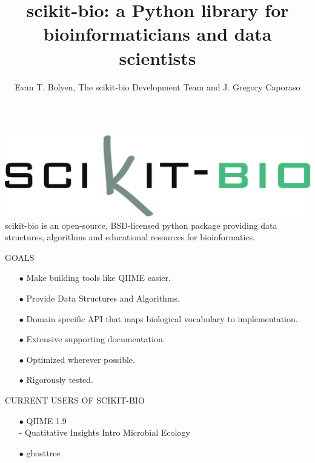 \documentclass[final,t]{beamer}
\title{\huge scikit-bio: a Python library for bioinformaticians and data scientists}
\author{Evan T. Bolyen, The scikit-bio Development Team and J. Gregory Caporaso}
\institute{Affiliations go here}
\begin{document}
\begin{frame}{}
  \begin{columns}[t]
    \begin{column}{.3\linewidth}
        \begin{alertblock}{\includegraphics[width=1\linewidth]{assets/skbio}\newline\newline}
          scikit-bio is an open-source, BSD-licensed python package providing data structures, algorithms and educational resources for bioinformatics.
          \newline\newline
        \end{alertblock}

        \begin{block}{GOALS}
            \large{\begin{itemize}
                \item[$\bullet$] Make building tools like QIIME easier.
                \item[$\bullet$] Provide Data Structures and Algorithms.
                \item[$\bullet$] Domain specific API that maps biological vocabulary to implementation.
                \item[$\bullet$] Extensive supporting documentation.
                \item[$\bullet$] Optimized wherever possible.
                \item[$\bullet$] Rigorously tested.
            \end{itemize}}
        \end{block}

        \begin{block}{\uppercase{Current Users of scikit-bio}}

            \large{\begin{itemize}
              \item[$\bullet$] QIIME 1.9 \hfill \\
              - Quatitative Insights Intro Microbial Ecology
              \item[$\bullet$] ghosttree
          \end{itemize}}
        \end{block}


\end{column}
\end{columns}
\end{frame}
\end{document}

